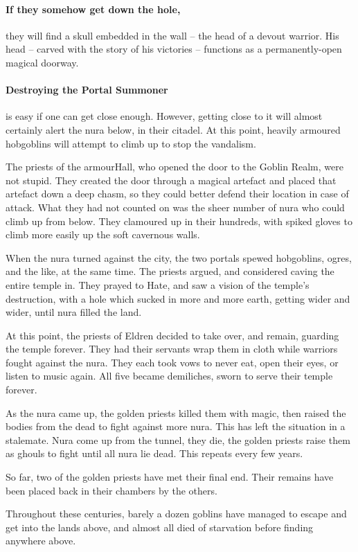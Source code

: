 \paragraph{If they somehow get down the hole,}
they will find a skull embedded in the wall -- the head of a devout warrior.
His head -- carved with the story of his victories -- functions as a permanently-open magical doorway.


\paragraph{Destroying the Portal Summoner}
is easy if one can get close enough.
However, getting close to it will almost certainly alert the nura below, in their citadel.
At this point, heavily armoured hobgoblins will attempt to climb up to stop the vandalism.

\hobgoblin

\begin{exampletext}

  The priests of the \gls{armourHall}, who opened the door to the Goblin Realm, were not stupid.
 They created the door through a magical artefact and placed that artefact down a deep chasm, so they could better defend their location in case of attack.
  What they had not counted on was the sheer number of nura who could climb up from below.
  They clamoured up in their hundreds, with spiked gloves to climb more easily up the soft cavernous walls.

  When the nura turned against the city, the two portals spewed hobgoblins, ogres, and the like, at the same time.
  The priests argued, and considered caving the entire temple in.
  They prayed to Hate, and saw a vision of the temple's destruction, with a hole which sucked in more and more earth, getting wider and wider, until nura filled the land.

  At this point, the priests of Eldren decided to take over, and remain, guarding the temple forever.
  They had their servants wrap them in cloth while warriors fought against the nura.
  They each took vows to never eat, open their eyes, or listen to music again.
  All five became demiliches, sworn to serve their temple forever.

  As the nura came up, the golden priests killed them with magic, then raised the bodies from the dead to fight against more nura.
  This has left the situation in a stalemate.
  Nura come up from the tunnel, they die, the golden priests raise them as ghouls to fight until all nura lie dead.
  This repeats every few years.

  So far, two of the golden priests have met their final end.
  Their remains have been placed back in their chambers by the others.

  Throughout these centuries, barely a dozen goblins have managed to escape and get into the lands above, and almost all died of starvation before finding anywhere above.

\end{exampletext}

